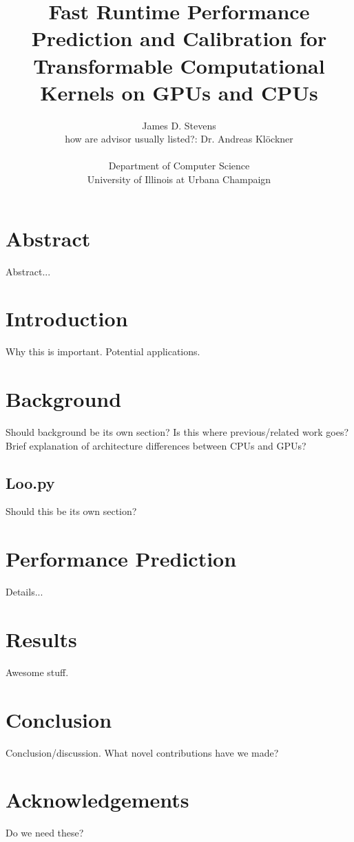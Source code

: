 \documentclass[12pt]{article}
\title{Fast Runtime Performance Prediction and Calibration for Transformable Computational Kernels on GPUs and CPUs}
\author{James D. Stevens
\\how are advisor usually listed?: Dr. Andreas Kl\"{o}ckner
\\
\\Department of Computer Science
\\University of Illinois at Urbana Champaign}
\begin{document}
\maketitle

\section*{Abstract}
Abstract...

\section{Introduction}
Why this is important.
Potential applications.

\section{Background}
Should background be its own section?
Is this where previous/related work goes?
Brief explanation of architecture differences between CPUs and GPUs?

\subsection{Loo.py}
Should this be its own section?~\cite{DBLP:journals/corr/Klockner14}

\section{Performance Prediction}
Details...

\section{Results}
Awesome stuff.

\section{Conclusion}
Conclusion/discussion.
What novel contributions have we made?

\section*{Acknowledgements}
Do we need these?

{}


\end{document}
